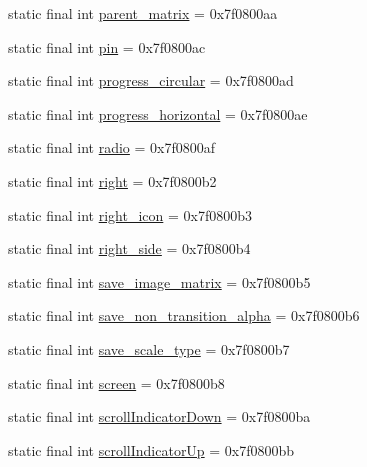 \begin{DoxyCompactItemize}
\item 
static final int \mbox{\hyperlink{classandroid_1_1support_1_1design_1_1_r_1_1id_a2bd745f280249f388515643ee6c1a821}{parent\+\_\+matrix}} = 0x7f0800aa
\item 
static final int \mbox{\hyperlink{classandroid_1_1support_1_1design_1_1_r_1_1id_a64b02d83c7966402e2d4731279fc4459}{pin}} = 0x7f0800ac
\item 
static final int \mbox{\hyperlink{classandroid_1_1support_1_1design_1_1_r_1_1id_a24bfc1b1443d3b08a28b08402fcfae13}{progress\+\_\+circular}} = 0x7f0800ad
\item 
static final int \mbox{\hyperlink{classandroid_1_1support_1_1design_1_1_r_1_1id_a0ab595e62dd9b749124e5adb812fa736}{progress\+\_\+horizontal}} = 0x7f0800ae
\item 
static final int \mbox{\hyperlink{classandroid_1_1support_1_1design_1_1_r_1_1id_a97840ad47561a6d255ff054ba4e9920d}{radio}} = 0x7f0800af
\item 
static final int \mbox{\hyperlink{classandroid_1_1support_1_1design_1_1_r_1_1id_a6d2ecb72c1c1c7e0da0f1b2b7d153e30}{right}} = 0x7f0800b2
\item 
static final int \mbox{\hyperlink{classandroid_1_1support_1_1design_1_1_r_1_1id_a54c6b12bf337a93aab8931cea42f9775}{right\+\_\+icon}} = 0x7f0800b3
\item 
static final int \mbox{\hyperlink{classandroid_1_1support_1_1design_1_1_r_1_1id_a93836db3949e044a6dfbad64ae62cab7}{right\+\_\+side}} = 0x7f0800b4
\item 
static final int \mbox{\hyperlink{classandroid_1_1support_1_1design_1_1_r_1_1id_a58cd069e576aa4d3eda461492763756f}{save\+\_\+image\+\_\+matrix}} = 0x7f0800b5
\item 
static final int \mbox{\hyperlink{classandroid_1_1support_1_1design_1_1_r_1_1id_a9480978f499efdfd69d36cd24da62e87}{save\+\_\+non\+\_\+transition\+\_\+alpha}} = 0x7f0800b6
\item 
static final int \mbox{\hyperlink{classandroid_1_1support_1_1design_1_1_r_1_1id_a343189d588551626c780b1569d7c03c3}{save\+\_\+scale\+\_\+type}} = 0x7f0800b7
\item 
static final int \mbox{\hyperlink{classandroid_1_1support_1_1design_1_1_r_1_1id_a613b55667004b367557c603b0c685f13}{screen}} = 0x7f0800b8
\item 
static final int \mbox{\hyperlink{classandroid_1_1support_1_1design_1_1_r_1_1id_a17784d8de2698de349a8c79f628577a1}{scroll\+Indicator\+Down}} = 0x7f0800ba
\item 
static final int \mbox{\hyperlink{classandroid_1_1support_1_1design_1_1_r_1_1id_a9e01295deb3b05381329d91aad8489a4}{scroll\+Indicator\+Up}} = 0x7f0800bb

\end{DoxyCompactItemize}
